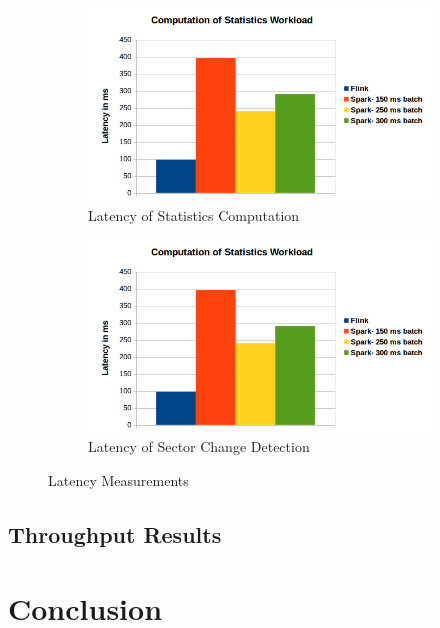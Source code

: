 \documentclass[]{article}
\begin{document}
\begin{figure}[h]
\begin{subfigure}{.5\textwidth}
  \centering
  \includegraphics[width=\linewidth]{latency1.png}
  \caption{Latency of Statistics Computation}

\end{subfigure}%
\begin{subfigure}{.5\textwidth}
  \centering
  \includegraphics[width=\linewidth]{latency1.png}
\caption{Latency of Sector Change Detection }

\end{subfigure}
\caption{Latency Measurements}
\label{fig:fig}
\end{figure}
\subsection{Throughput Results}



\section{Conclusion}
\end{document}
